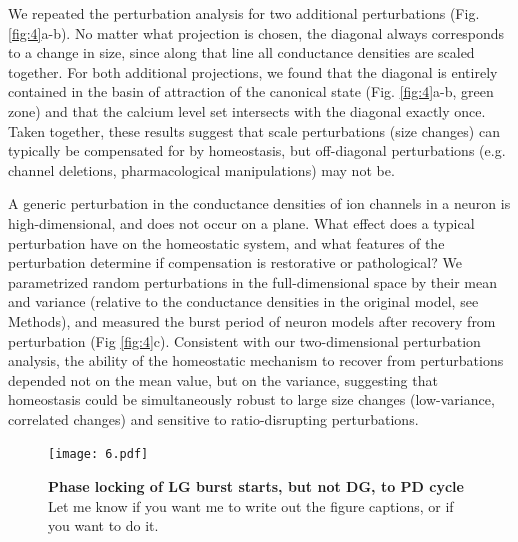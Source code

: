 \documentclass[9pt,lineno]{elife}
\begin{document}
We repeated the perturbation analysis for two additional perturbations (Fig. \ref{fig:4}a-b). No matter what projection is chosen, the diagonal always corresponds to a change in size, since along that line all conductance densities are scaled together. For both additional projections, we found that the diagonal is entirely contained in the basin of attraction of the canonical state (Fig. \ref{fig:4}a-b, green zone) and that the calcium level set intersects with the diagonal exactly once. Taken together, these results suggest that scale perturbations (size changes) can typically be compensated for by homeostasis, but off-diagonal perturbations (e.g. channel deletions, pharmacological manipulations) may not be. 

A generic perturbation in the conductance densities of ion channels in a neuron is high-dimensional, and does not occur on a plane. What effect does a typical perturbation have on the homeostatic system, and what features of the perturbation determine if compensation is restorative or pathological? We parametrized random perturbations in the full-dimensional space by their mean and variance (relative to the conductance densities in the original model, see Methods), and measured the burst period of neuron models after recovery from perturbation (Fig \ref{fig:4}c). Consistent with our two-dimensional perturbation analysis, the ability of the homeostatic mechanism to recover from perturbations depended not on the mean value, but on the variance, suggesting that homeostasis could be simultaneously robust to large size changes (low-variance, correlated changes) and sensitive to ratio-disrupting perturbations. 

\begin{figure}[!hbp]
\centering
\begin{fullwidth}
\texttt{[image: 6.pdf]}
\end{fullwidth}
\caption{\textbf{Phase locking of LG burst starts, but not DG, to PD cycle} Let me know if you want me to write out the figure captions, or if you want to do it.   }
\end{figure}
\end{document}
